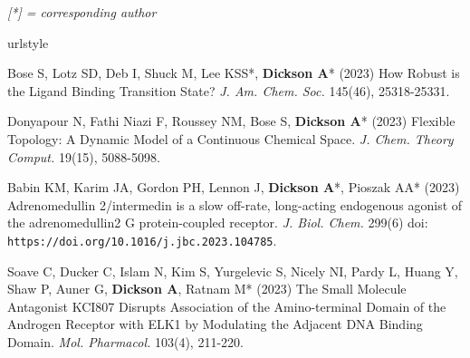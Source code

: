 \documentclass[margin,line]{res}
\begin{document}
\begin{resume}

\emph{[*] = corresponding author}
\vspace {0.05in}

\begingroup
\begin{spacing}{1.2}
\renewcommand{\section}[2]{}%
\begin{thebibliography}{10}
\providecommand{\url}[1]{\texttt{#1}}
\providecommand{\urlprefix}{URL }
\expandafter\ifx\csname urlstyle\endcsname\relax
  \providecommand{\doi}[1]{doi:\discretionary{}{}{}#1}\else
  \providecommand{\doi}{doi:\discretionary{}{}{}\begingroup
  \urlstyle{rm}\Url}\fi
\providecommand{\bibAnnoteFile}[1]{%
  \IfFileExists{#1}{\begin{quotation}\noindent\textsc{Key:} #1\\
  \textsc{Annotation:}\ \end{quotation}}{}}
\providecommand{\bibAnnote}[2]{%
  \begin{quotation}\noindent\textsc{Key:} #1\\
  \textsc{Annotation:}\ #2\end{quotation}}
\providecommand{\eprint}[2][]{\url{#2}}

\setlength{\itemsep}{0.15in}

  Bose S, Lotz SD, Deb I, Shuck M, Lee KSS*, {\bf Dickson A}* (2023) How Robust is the Ligand Binding Transition State?
  \newblock \textit{J. Am. Chem. Soc.} 145(46), 25318-25331. 

  Donyapour N, Fathi Niazi F, Roussey NM, Bose S, {\bf Dickson A}* (2023) Flexible Topology: A Dynamic Model of a Continuous Chemical Space.
  \newblock \textit{J. Chem. Theory Comput.} 19(15), 5088-5098. 

  Babin KM, Karim JA, Gordon PH, Lennon J, {\bf Dickson A}*, Pioszak AA* (2023) Adrenomedullin 2/intermedin is a slow off-rate, long-acting endogenous agonist of the adrenomedullin2 G protein-coupled receptor.
  \newblock \textit{J. Biol. Chem.} 299(6) doi: \url{https://doi.org/10.1016/j.jbc.2023.104785}.

  Soave C, Ducker C, Islam N, Kim S, Yurgelevic S, Nicely NI, Pardy L, Huang Y, Shaw P, Auner G, {\bf Dickson A}, Ratnam M* (2023) The Small Molecule Antagonist KCI807 Disrupts Association of the Amino-terminal Domain of the Androgen Receptor with ELK1 by Modulating the Adjacent DNA Binding Domain.
  \newblock \textit{Mol. Pharmacol.} 103(4), 211-220. 


\end{thebibliography}
\end{spacing}
\end{resume}
\end{document}
